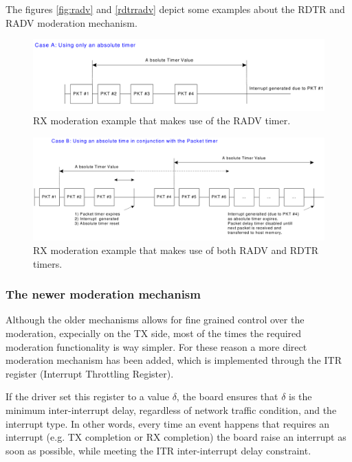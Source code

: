 The figures \ref{fig:radv} and \ref{rdtrradv} depict some examples about the RDTR and RADV moderation mechanism.

\begin{figure}[bt]
\centering
\includegraphics[scale = 0.45]{radv-only.png}
\caption{RX moderation example that makes use of the RADV timer.}
\label{fig:radvonly}
\end{figure}

\begin{figure}[bt]
\centering
\includegraphics[scale = 0.45]{rdtr-radv.png}
\caption{RX moderation example that makes use of both RADV and RDTR timers.}
\label{fig:rdtrradv}
\end{figure}


\subsubsection{The newer moderation mechanism}
Although the older mechanisms allows for fine grained control over the moderation, expecially on the TX side, most of the times the 
required moderation functionality is way simpler. For these reason a more direct moderation mechanism has been added, which is implemented
through the ITR register (Interrupt Throttling Register).

If the driver set this register to a value $\delta$, the board ensures that $\delta$ is the minimum inter-interrupt delay, regardless of
network traffic condition, and the interrupt type.
In other words, every time an event happens that requires an interrupt (e.g. TX completion or RX completion) the board raise an interrupt
as soon as possible, while meeting the ITR inter-interrupt delay constraint.

